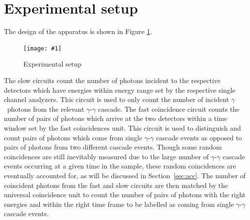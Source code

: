 \documentclass[twocolumn]{article}
\newcommand{\insertFigure}[1]{%
   \texttt{[image: \#1]}%
}
\begin{document}
\section{Experimental setup}
The design of the apparatus is shown in Figure \ref{fig:exp_setup}. 
\begin{figure}[!h]
	\centering
	\insertFigure{k223_setup.png}
	\caption{Experimental setup\cite{booklet}}
	\label{fig:exp_setup}
\end{figure}
The slow circuits count the number of photons incident to the respective detectors which have energies within energy range set by the respective single channel analyzers. This circuit is used to only count the number of incident $\gamma$~photons from the relevant $\gamma$-$\gamma$ cascade. The fast coincidence circuit counts the number of pairs of photons which arrive at the two detectors within a time window set by the fast coincidences unit. This circuit is used to distinguish and count pairs of photons which come from single $\gamma$-$\gamma$ cascade events as opposed to pairs of photons from two different cascade events. Though some random coincidences are still inevitably measured due to the large number of $\gamma$-$\gamma$ cascade events occurring at a given time in the sample, these random coincidences are eventually accounted for, as will be discussed in Section~\ref{sec:acc}. The number of coincident photons from the fast and slow circuits are then matched by the universal coincidence unit to count the number of pairs of photons with the right energies and within the right time frame to be labelled as coming from single $\gamma$-$\gamma$ cascade events.
\end{document}
